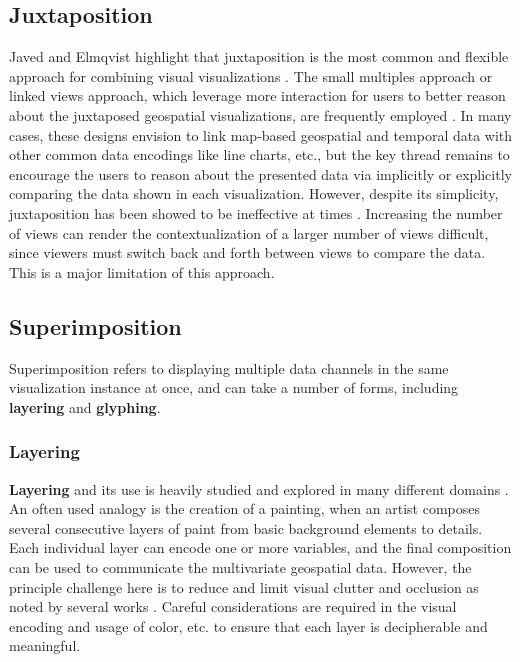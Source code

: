 \subsection{Juxtaposition}
\label{subsec:jux}
Javed and Elmqvist highlight that juxtaposition is the most common and flexible approach for combining visual visualizations \cite{javed_exploring_2012}.
%
The small multiples approach or linked views approach, which leverage more interaction for users to better reason about the juxtaposed geospatial visualizations, are frequently employed \cite{deng_visualizing_2023, yang2022epimob}.
%
In many cases, these designs envision to link map-based geospatial and temporal data with other common data encodings like line charts, etc., but the key thread remains to encourage the users to reason about the presented data via implicitly or explicitly comparing the data shown in each visualization.
%
%
However, despite its simplicity, juxtaposition has been showed to be ineffective at times \cite{ramachandran2009visualizing, nusrat2017cartogram}.
%
Increasing the number of views can render the contextualization of a larger number of views difficult, since viewers must switch back and forth between views to compare the data.
%
This is a major limitation of this approach.

\subsection{Superimposition}
\label{subsec:super}
Superimposition refers to displaying multiple data channels in the same visualization instance at once, and can take a number of forms, including \textbf{layering} and \textbf{glyphing}.

\subsubsection{Layering}
\textbf{Layering} and its use is heavily studied and explored in many different domains \cite{allan_decal_2017, lobo2017mapmosaic, heer2009sizing}.
%
An often used analogy is the creation of a painting, when an artist composes several consecutive layers of paint from basic background elements to details.
%
Each individual layer can encode one or more variables, and the final composition can be used to communicate the multivariate geospatial data.
%
However, the principle challenge here is to reduce and limit visual clutter and occlusion as noted by several works \cite{mota_comparison_2022, mayr_once_2018}.
%
Careful considerations are required in the visual encoding and usage of color, etc. to ensure that each layer is decipherable and meaningful. 

